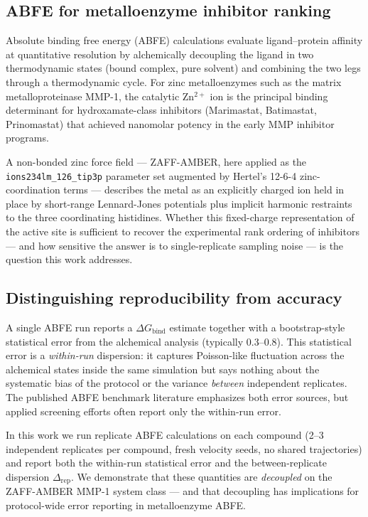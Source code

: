 \documentclass[11pt,a4paper]{article}
\newcommand{\dG}{\Delta G}
\newcommand{\dGbind}{\dG_{\mathrm{bind}}}
\newcommand{\kcalmol}{\mathrm{kcal\,mol^{-1}}}
\begin{document}
\subsection{ABFE for metalloenzyme inhibitor ranking}

Absolute binding free energy (ABFE) calculations evaluate ligand--protein
affinity at quantitative resolution by alchemically decoupling the ligand
in two thermodynamic states (bound complex, pure solvent) and combining
the two legs through a thermodynamic cycle. For zinc metalloenzymes such
as the matrix metalloproteinase MMP-1, the catalytic
Zn$^{2+}$ ion is the principal binding determinant for hydroxamate-class
inhibitors (Marimastat, Batimastat, Prinomastat) that achieved nanomolar
potency in the early MMP inhibitor programs.

A non-bonded zinc force field --- ZAFF-AMBER, here applied as the
\texttt{ions234lm\_126\_tip3p} parameter set augmented by Hertel's
12-6-4 zinc-coordination terms --- describes the metal as an explicitly
charged ion held in place by short-range Lennard-Jones potentials
plus implicit harmonic restraints to the three coordinating histidines.
Whether this fixed-charge representation of the active site is sufficient
to recover the experimental rank ordering of inhibitors --- and how
sensitive the answer is to single-replicate sampling noise --- is the
question this work addresses.

\subsection{Distinguishing reproducibility from accuracy}

A single ABFE run reports a $\dGbind$ estimate together with a
bootstrap-style statistical error from the alchemical analysis
(typically \SIrange{0.3}{0.8}{\kcalmol}). This statistical error is a
\emph{within-run} dispersion: it captures Poisson-like fluctuation across
the alchemical states inside the same simulation but says nothing about
the systematic bias of the protocol or the variance \emph{between}
independent replicates. The published ABFE benchmark literature
\citep{aldeghi2017accurate, mey2020best, schindler2020large}
emphasizes both error sources, but applied screening efforts often
report only the within-run error.

In this work we run replicate ABFE calculations on each compound
(2--3 independent replicates per compound, fresh velocity seeds, no
shared trajectories) and report both the within-run statistical error
and the between-replicate dispersion $\Delta_{\text{rep}}$. We
demonstrate that these quantities are \emph{decoupled} on the
ZAFF-AMBER MMP-1 system class --- and that decoupling has implications
for protocol-wide error reporting in metalloenzyme ABFE.
\end{document}
